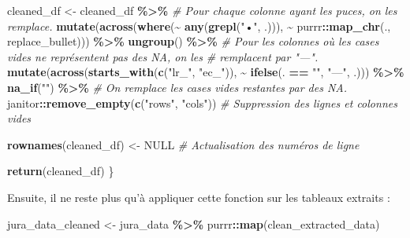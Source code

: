 \documentclass[
  french,
]{book}
\newenvironment{Shaded}{\begin{snugshade}}{\end{snugshade}}
\newcommand{\CommentTok}[1]{\textcolor[rgb]{0.56,0.35,0.01}{\textit{#1}}}
\newcommand{\KeywordTok}[1]{\textcolor[rgb]{0.13,0.29,0.53}{\textbf{#1}}}
\newcommand{\NormalTok}[1]{#1}
\newcommand{\OperatorTok}[1]{\textcolor[rgb]{0.81,0.36,0.00}{\textbf{#1}}}
\newcommand{\OtherTok}[1]{\textcolor[rgb]{0.56,0.35,0.01}{#1}}
\newcommand{\StringTok}[1]{\textcolor[rgb]{0.31,0.60,0.02}{#1}}
\begin{document}
\begin{Shaded}
\begin{Highlighting}[]
\NormalTok{  cleaned\_df \textless{}{-}}\StringTok{ }\NormalTok{cleaned\_df }\OperatorTok{\%\textgreater{}\%}
\StringTok{    }\CommentTok{\# Pour chaque colonne ayant les puces, on les remplace.}
\StringTok{    }\KeywordTok{mutate}\NormalTok{(}\KeywordTok{across}\NormalTok{(}\KeywordTok{where}\NormalTok{(}\OperatorTok{\textasciitilde{}}\StringTok{ }\KeywordTok{any}\NormalTok{(}\KeywordTok{grepl}\NormalTok{(}\StringTok{"•"}\NormalTok{, .))), }\OperatorTok{\textasciitilde{}}\StringTok{ }\NormalTok{purrr}\OperatorTok{::}\KeywordTok{map\_chr}\NormalTok{(., replace\_bullet))) }\OperatorTok{\%\textgreater{}\%}
\StringTok{    }\KeywordTok{ungroup}\NormalTok{() }\OperatorTok{\%\textgreater{}\%}
\StringTok{    }\CommentTok{\# Pour les colonnes où les cases vides ne représentent pas des NA, on les}
\StringTok{    }\CommentTok{\# remplacent par "—".}
\StringTok{    }\KeywordTok{mutate}\NormalTok{(}\KeywordTok{across}\NormalTok{(}\KeywordTok{starts\_with}\NormalTok{(}\KeywordTok{c}\NormalTok{(}\StringTok{"lr\_"}\NormalTok{, }\StringTok{"ec\_"}\NormalTok{)), }\OperatorTok{\textasciitilde{}}\StringTok{ }\KeywordTok{ifelse}\NormalTok{(. }\OperatorTok{==}\StringTok{ ""}\NormalTok{, }\StringTok{"—"}\NormalTok{, .))) }\OperatorTok{\%\textgreater{}\%}
\StringTok{    }\KeywordTok{na\_if}\NormalTok{(}\StringTok{""}\NormalTok{) }\OperatorTok{\%\textgreater{}\%}\StringTok{ }\CommentTok{\# On remplace les cases vides restantes par des NA.}
\StringTok{    }\NormalTok{janitor}\OperatorTok{::}\KeywordTok{remove\_empty}\NormalTok{(}\KeywordTok{c}\NormalTok{(}\StringTok{"rows"}\NormalTok{, }\StringTok{"cols"}\NormalTok{)) }\CommentTok{\# Suppression des lignes et colonnes vides}
  
  \KeywordTok{rownames}\NormalTok{(cleaned\_df) \textless{}{-}}\StringTok{ }\OtherTok{NULL} \CommentTok{\# Actualisation des numéros de ligne}
  
  \KeywordTok{return}\NormalTok{(cleaned\_df)}
\NormalTok{\}}
\end{Highlighting}
\end{Shaded}

Ensuite, il ne reste plus qu'à appliquer cette fonction sur les tableaux
extraits :

\begin{Shaded}
\begin{Highlighting}[]
\NormalTok{jura\_data\_cleaned \textless{}{-}}\StringTok{ }\NormalTok{jura\_data }\OperatorTok{\%\textgreater{}\%}\StringTok{ }\NormalTok{purrr}\OperatorTok{::}\KeywordTok{map}\NormalTok{(clean\_extracted\_data)}
\end{Highlighting}
\end{Shaded}
\end{document}
